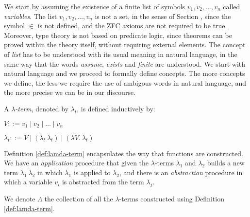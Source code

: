 We start by assuming the existence of a finite list of symbols $v_1, v_2, \ldots, v_n$ called \emph{variables}. The list $v_1, v_2, \ldots, v_n$ is not a set, in the sense of Section \label{sec:set_theory}, since the symbol $\in$ is not defined, and the ZFC axioms are not required to be true. Moreover, type theory is not based on predicate logic, since theorems can be proved within the theory itself, without requiring external elements. The concept of \emph{list} has to be understood with its usual meaning in natural language, in the same way that the words \emph{assume}, \emph{exists} and \emph{finite} are understood. We start with natural language and we proceed to formally define concepts. The more concepts we define, the less we require the use of ambigous words in natural language, and the more precise we can be in our discourse.

\begin{definition}
\label{def:lamda-term}

A \emph{$\lambda$-term}, denoted by $\lambda_t$, is defined inductively by:

$V ::= v_1 \mid v_2 \mid \ldots \mid v_n$

$\lambda_t ::= V \mid \left( \lambda_t \: \lambda_t \right) \mid \left( \lambda V. \: \lambda_t \right)$

\end{definition}

Definition \ref{def:lamda-term} encapsulates the way that functions are constructed. We have an \emph{application} procedure that given the $\lambda$-terms $\lambda_1$ and $\lambda_2$ builds a new term $\lambda_1 \: \lambda_2$ in which $\lambda_1$ is applied to $\lambda_2$, and there is an \emph{abstraction} procedure in which a variable $v_i$ is abstracted from the term $\lambda_j$.

We denote $\Lambda$ the collection of all the $\lambda$-terms constructed using Definition \ref{def:lamda-term}.


